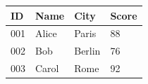 \begin{table}[htbp]
\centering
\begin{tabular}{llll}
\toprule
ID & Name & City & Score \\
\midrule
001 & Alice & Paris & 88 \\
002 & Bob & Berlin & 76 \\
003 & Carol & Rome & 92 \\
\bottomrule
\end{tabular}
\end{table}
